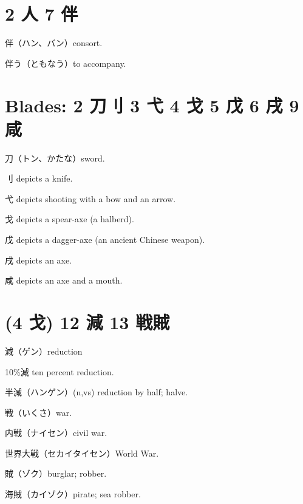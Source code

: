 \section{2 人 7 伴}

伴（ハン、バン）consort.

伴う（ともなう）to accompany.

\section{Blades: 2 刀刂 3 弋 4 戈 5 戊 6 戌 9 咸}

刀（トン、かたな）sword.

刂 depicts a knife.

弋 depicts shooting with a bow and an arrow.

戈 depicts a spear-axe (a halberd).

戊 depicts a dagger-axe (an ancient Chinese weapon).

戌 depicts an axe.

咸 depicts an axe and a mouth.

\section{(4 戈) 12 減 13 戦賊}

減（ゲン）reduction

10\%減 ten percent reduction.

半減（ハンゲン）(n,vs) reduction by half; halve.

戦（いくさ）war.

内戦（ナイセン）civil war.

世界大戦（セカイタイセン）World War.

賊（ゾク）burglar; robber.

海賊（カイゾク）pirate; sea robber.
